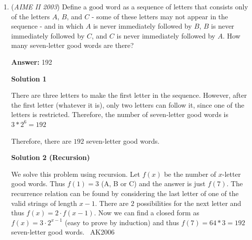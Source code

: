 \begin{enumerate}
 $9876543abc$

 The abc is there because we don't have the guarantee of divisibility by 8. abc will be a rearrangement of $0, 1, 2$

 Now all we have to do is look for the smallest rearrangement of 0, 1, 2. We can write a congruence statement as shown: 

 $100a+10b+10c \cong 0 \mod 8$

 which simplifies to:

 $4a+2b+c \cong 0 \mod 8$

 Now, since we want to minimize the number, we can first try the case when a = 0. 

 This doesn't work, as 2+0 isn't congruent to 0 mod 8. 

 Now lets try a = 1.

 We have $4 + 2b + c \cong 0 \mod 8$

 From which we get 120 as the smallest. 

 Now, taking adding that to the number, we get 9876543120. Getting the remainder mod 1000 gives $\boxed{120}$



	\item (\textit{AIME II 2003}) Define a $\text{good word}$ as a sequence of letters that consists only of the letters $A$, $B$, and $C$ - some of these letters may not appear in the sequence - and in which $A$ is never immediately followed by $B$, $B$ is never immediately followed by $C$, and $C$ is never immediately followed by $A$. How many seven-letter good words are there?


 
 \textbf{Answer: }192



\textbf{Solution 1}

There are three letters to make the first letter in the sequence. However, after the first letter (whatever it is), only two letters can follow it, since one of the letters is restricted. Therefore, the number of seven-letter good words is $3*2^6=192$

 Therefore, there are $\boxed{192}$ seven-letter good words.

 



\textbf{Solution 2 (Recursion)}

We solve this problem using recursion. Let $f(x)$ be the number of $x$-letter good words. Thus $f(1) = 3$ (A, B or C) and the answer is just $f(7)$.  The recurrence relation can be found by considering the last letter of one of the valid strings of length $x - 1$.  There are $2$ possibilities for the next letter and thus $f(x) = 2 \cdot f(x-1)$.  Now we can find a closed form as $f(x) = 3 \cdot 2 ^{x-1}$  (easy to prove by induction) and thus $f(7) = 64 * 3 = \boxed{192}$ seven-letter good words.  ~AK2006


\end{enumerate}
